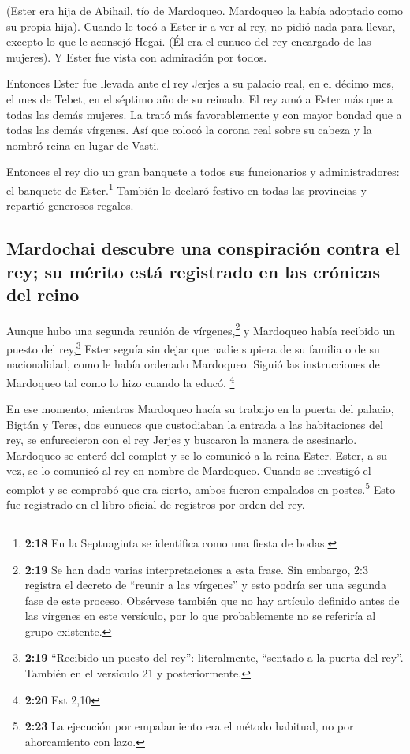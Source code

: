  (Ester era hija de Abihail, tío de Mardoqueo. Mardoqueo
la había adoptado como su propia hija). Cuando le tocó a Ester ir a ver
al rey, no pidió nada para llevar, excepto lo que le aconsejó Hegai. (Él
era el eunuco del rey encargado de las mujeres). Y Ester fue vista con
admiración por todos.

 Entonces Ester fue llevada ante el rey Jerjes a su
palacio real, en el décimo mes, el mes de Tebet, en el séptimo año de su
reinado.  El rey amó a Ester más que a todas las demás
mujeres. La trató más favorablemente y con mayor bondad que a todas las
demás vírgenes. Así que colocó la corona real sobre su cabeza y la
nombró reina en lugar de Vasti.

 Entonces el rey dio un gran banquete a todos sus
funcionarios y administradores: el banquete de Ester.\footnote{\textbf{2:18}
  En la Septuaginta se identifica como una fiesta de bodas.} También lo
declaró festivo en todas las provincias y repartió generosos regalos.

\hypertarget{mardochai-descubre-una-conspiraciuxf3n-contra-el-rey-su-muxe9rito-estuxe1-registrado-en-las-cruxf3nicas-del-reino}{%
\subsection{Mardochai descubre una conspiración contra el rey; su mérito
está registrado en las crónicas del
reino}\label{mardochai-descubre-una-conspiraciuxf3n-contra-el-rey-su-muxe9rito-estuxe1-registrado-en-las-cruxf3nicas-del-reino}}

 Aunque hubo una segunda reunión de vírgenes,\footnote{\textbf{2:19}
  Se han dado varias interpretaciones a esta frase. Sin embargo, 2:3
  registra el decreto de ``reunir a las vírgenes'' y esto podría ser una
  segunda fase de este proceso. Obsérvese también que no hay artículo
  definido antes de las vírgenes en este versículo, por lo que
  probablemente no se referiría al grupo existente.} y Mardoqueo había
recibido un puesto del rey,\footnote{\textbf{2:19} ``Recibido un puesto
  del rey'': literalmente, ``sentado a la puerta del rey''. También en
  el versículo 21 y posteriormente.}  Ester seguía sin
dejar que nadie supiera de su familia o de su nacionalidad, como le
había ordenado Mardoqueo. Siguió las instrucciones de Mardoqueo tal como
lo hizo cuando la educó. \footnote{\textbf{2:20} Est 2,10}

 En ese momento, mientras Mardoqueo hacía su trabajo en
la puerta del palacio, Bigtán y Teres, dos eunucos que custodiaban la
entrada a las habitaciones del rey, se enfurecieron con el rey Jerjes y
buscaron la manera de asesinarlo.  Mardoqueo se enteró
del complot y se lo comunicó a la reina Ester. Ester, a su vez, se lo
comunicó al rey en nombre de Mardoqueo.  Cuando se
investigó el complot y se comprobó que era cierto, ambos fueron
empalados en postes.\footnote{\textbf{2:23} La ejecución por
  empalamiento era el método habitual, no por ahorcamiento con lazo.}
Esto fue registrado en el libro oficial de registros por orden del rey.

